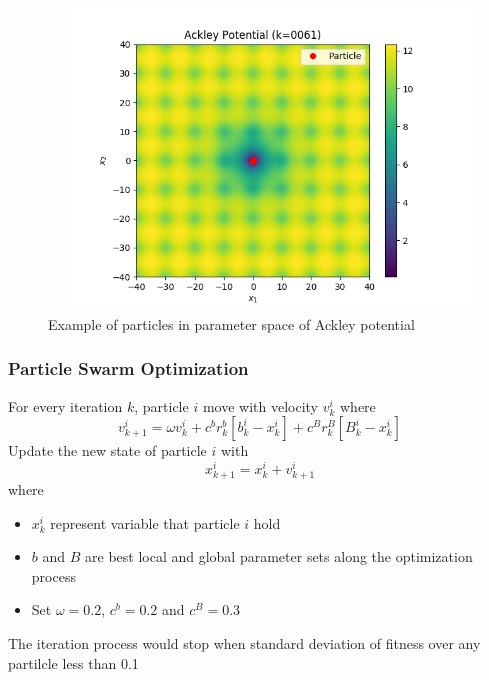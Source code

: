 \documentclass{beamer}
\begin{document}
\begin{frame}
\begin{figure}
\begin{columns}
\begin{column}{0.34\textwidth}
  \end{column}
  \begin{column}{0.34\textwidth}
    \includegraphics[width=\columnwidth]{figure/particle_swarm0061}
  \end{column}
\end{columns}
\caption{Example of particles in parameter space of Ackley potential}
\end{figure}
\end{frame}


\begin{frame}\frametitle{Particle Swarm Optimization}
For every iteration $k$, particle $i$ move with velocity $v^i_k$ where
\begin{equation}
  v^i_{k+1} = \omega v^i_k + c^br^b_k[b^i_k-x^i_k] + c^Br^B_k[B^i_k-x^i_k]
\end{equation}
Update the new state of particle $i$ with
\begin{equation}
  x^i_{k+1} = x^i_k + v^i_{k+1}
\end{equation}
where
\begin{itemize}
  \item $x^i_k$ represent variable that particle $i$ hold
  \item $b$ and $B$ are best local and global parameter sets along the optimization process
  \item Set $\omega = 0.2$, $c^b = 0.2$ and $c^B = 0.3$
\end{itemize}
The iteration process would stop when standard deviation of fitness over any partilcle less than 0.1
\end{frame}
\end{document}
